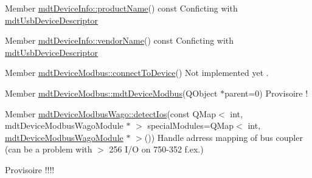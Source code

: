 \begin{DoxyDescription}
\item[Member \hyperlink{classmdt_device_info_afe4bbdc87acff59999905a0eeb812fe1}{mdtDeviceInfo::productName}() const  ]Conficting with \hyperlink{classmdt_usb_device_descriptor}{mdtUsbDeviceDescriptor} 
\end{DoxyDescription}

\label{todo__todo000032}
\hypertarget{todo__todo000032}{}
 
\begin{DoxyDescription}
\item[Member \hyperlink{classmdt_device_info_a207d7b6b49fd65726232e95cd9e0568c}{mdtDeviceInfo::vendorName}() const  ]Conficting with \hyperlink{classmdt_usb_device_descriptor}{mdtUsbDeviceDescriptor} 
\end{DoxyDescription}

\label{todo__todo000011}
\hypertarget{todo__todo000011}{}
 
\begin{DoxyDescription}
\item[Member \hyperlink{classmdt_device_modbus_abfcab17fbf05aab7843ae689316dd01f}{mdtDeviceModbus::connectToDevice}() ]Not implemented yet . 
\end{DoxyDescription}

\label{todo__todo000008}
\hypertarget{todo__todo000008}{}
 
\begin{DoxyDescription}
\item[Member \hyperlink{classmdt_device_modbus_ac69cfbe26681342ba05672ab63de2a1f}{mdtDeviceModbus::mdtDeviceModbus}(QObject $\ast$parent=0) ]Provisoire ! 
\end{DoxyDescription}

\label{todo__todo000012}
\hypertarget{todo__todo000012}{}
 
\begin{DoxyDescription}
\item[Member \hyperlink{classmdt_device_modbus_wago_aae46b00317190b70a59080e9b2917ed6}{mdtDeviceModbusWago::detectIos}(const QMap$<$ int, mdtDeviceModbusWagoModule $\ast$ $>$ specialModules=QMap$<$ int, \hyperlink{classmdt_device_modbus_wago_module}{mdtDeviceModbusWagoModule} $\ast$ $>$()) ]Handle adrress mapping of bus coupler (can be a problem with $>$ 256 I/O on 750-\/352 f.ex.) 

Provisoire !!!! 
\end{DoxyDescription}

\label{todo__todo000015}
\hypertarget{todo__todo000015}{}
 
